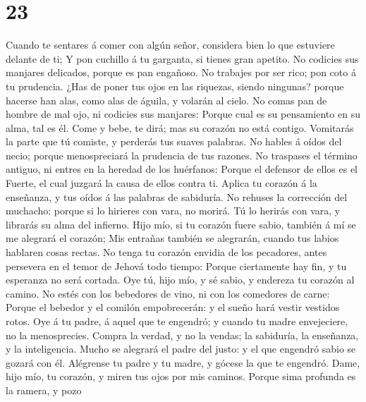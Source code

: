 \hypertarget{section-22}{%
\section{23}\label{section-22}}

 Cuando te sentares á comer con algún señor, considera bien
lo que estuviere delante de ti;  Y pon cuchillo á tu
garganta, si tienes gran apetito.  No codicies sus manjares
delicados, porque es pan engañoso.  No trabajes por ser
rico; pon coto á tu prudencia.  ¿Has de poner tus ojos en
las riquezas, siendo ningunas? porque hacerse han alas, como alas de
águila, y volarán al cielo.  No comas pan de hombre de mal
ojo, ni codicies sus manjares:  Porque cual es su
pensamiento en su alma, tal es él. Come y bebe, te dirá; mas su corazón
no está contigo.  Vomitarás la parte que tú comiste, y
perderás tus suaves palabras.  No hables á oídos del necio;
porque menospreciará la prudencia de tus razones.  No
traspases el término antiguo, ni entres en la heredad de los huérfanos:
 Porque el defensor de ellos es el Fuerte, el cual juzgará
la causa de ellos contra ti.  Aplica tu corazón á la
enseñanza, y tus oídos á las palabras de sabiduría.  No
rehuses la corrección del muchacho: porque si lo hirieres con vara, no
morirá.  Tú lo herirás con vara, y librarás su alma del
infierno.  Hijo mío, si tu corazón fuere sabio, también á
mí se me alegrará el corazón;  Mis entrañas también se
alegrarán, cuando tus labios hablaren cosas rectas.  No
tenga tu corazón envidia de los pecadores, antes persevera en el temor
de Jehová todo tiempo:  Porque ciertamente hay fin, y tu
esperanza no será cortada.  Oye tú, hijo mío, y sé sabio, y
endereza tu corazón al camino.  No estés con los bebedores
de vino, ni con los comedores de carne:  Porque el bebedor
y el comilón empobrecerán: y el sueño hará vestir vestidos rotos.
 Oye á tu padre, á aquel que te engendró; y cuando tu madre
envejeciere, no la menosprecies.  Compra la verdad, y no la
vendas; la sabiduría, la enseñanza, y la inteligencia. 
Mucho se alegrará el padre del justo: y el que engendró sabio se gozará
con él.  Alégrense tu padre y tu madre, y gócese la que te
engendró.  Dame, hijo mío, tu corazón, y miren tus ojos por
mis caminos.  Porque sima profunda es la ramera, y pozo
